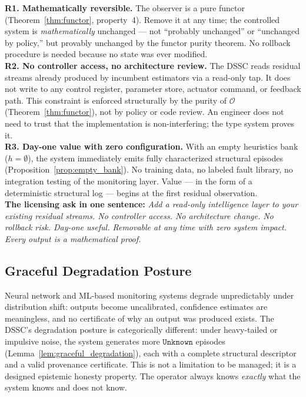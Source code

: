 \documentclass[11pt,a4paper]{article}
\theoremstyle{plain}
\theoremstyle{definition}
\theoremstyle{remark}
\newcommand{\Obs}{\mathcal{O}}
\begin{document}
\begin{center}
\begin{tcolorbox}[colback=gray!6, colframe=gray!55, boxrule=0.6pt, arc=3pt,
  left=7pt, right=7pt, top=6pt, bottom=6pt,
  title={\textbf{Observer-Only Overlay: Zero-Integration-Risk Properties}},
  fonttitle=\small\bfseries, coltitle=black]
\textbf{R1. Mathematically reversible.}
The observer is a pure functor (Theorem~\ref{thm:functor}, property~4).
Remove it at any time; the controlled system is \emph{mathematically} unchanged --- not
``probably unchanged'' or ``unchanged by policy,'' but provably unchanged by the
functor purity theorem. No rollback procedure is needed because no state was ever modified.
\\[0.3em]
\textbf{R2. No controller access, no architecture review.}
The DSSC reads residual streams already produced by incumbent estimators via a read-only
tap. It does not write to any control register, parameter store, actuator command, or
feedback path. This constraint is enforced structurally by the purity of $\Obs$
(Theorem~\ref{thm:functor}), not by policy or code review. An engineer does not need
to trust that the implementation is non-interfering; the type system proves it.
\\[0.3em]
\textbf{R3. Day-one value with zero configuration.}
With an empty heuristics bank ($h = \emptyset$), the system immediately emits fully
characterized structural episodes (Proposition~\ref{prop:empty_bank}). No training
data, no labeled fault library, no integration testing of the monitoring layer.
Value --- in the form of a deterministic structural log --- begins at the first
residual observation.
\\[0.3em]
\textbf{The licensing ask in one sentence:}
\textit{Add a read-only intelligence layer to your existing residual streams. No
controller access. No architecture change. No rollback risk. Day-one useful.
Removable at any time with zero system impact. Every output is a mathematical proof.}
\end{tcolorbox}
\end{center}

\subsection{Graceful Degradation Posture}

Neural network and ML-based monitoring systems degrade unpredictably under distribution shift:
outputs become uncalibrated, confidence estimates are meaningless, and no certificate of why an
output was produced exists. The DSSC's degradation posture is categorically different:
under heavy-tailed or impulsive noise, the system generates more $\mathtt{Unknown}$ episodes
(Lemma~\ref{lem:graceful_degradation}), each with a complete structural descriptor and a valid
provenance certificate. This is not a limitation to be managed; it is a designed epistemic
honesty property. The operator always knows \emph{exactly} what the system knows and does not
know.
\end{document}
